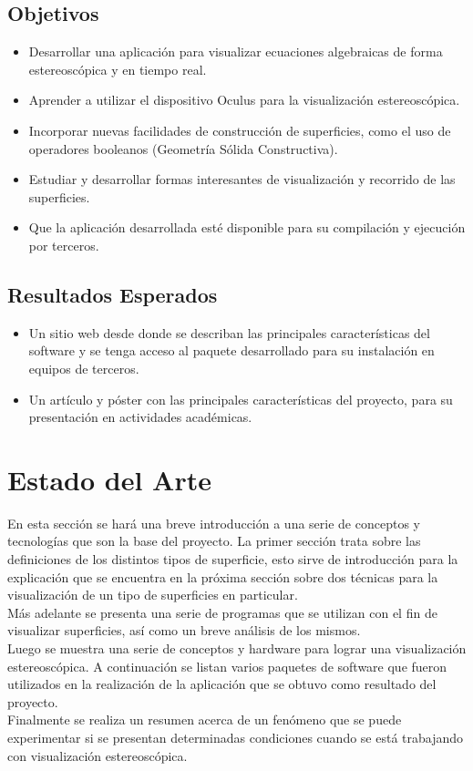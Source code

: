 \documentclass[12pt]{article}
\begin{document}
\subsection{Objetivos}
\begin{itemize}
\item Desarrollar una aplicación para visualizar ecuaciones algebraicas de forma estereoscópica y en tiempo real.
\item Aprender a utilizar el dispositivo Oculus para la visualización estereoscópica. 
\item Incorporar nuevas facilidades de construcción de superficies, como el uso de operadores booleanos (Geometría Sólida Constructiva). 
\item Estudiar y desarrollar formas interesantes de visualización y recorrido de las superficies.
\item Que la aplicación desarrollada esté disponible para su compilación y ejecución por terceros. 
\end{itemize}
\subsection{Resultados Esperados}
\begin{itemize}
\item Un sitio web desde donde se describan las principales características del software y se tenga acceso al paquete desarrollado para su instalación en equipos de terceros. 
\item Un artículo y póster con las principales características del proyecto, para su presentación en actividades académicas.
\end{itemize}
\clearpage
\section{Estado del Arte}
En esta sección se hará una breve introducción a una serie de conceptos y tecnologías que son la base del proyecto. La primer sección trata sobre las definiciones de los distintos tipos de superficie, esto sirve de introducción para la explicación que se encuentra en la próxima sección sobre dos técnicas para la visualización de un tipo de superficies en particular. 
\\Más adelante se presenta una serie de programas que se utilizan con el fin de visualizar superficies, así como un breve análisis de los mismos.
\\Luego se muestra una serie de conceptos y hardware para lograr una visualización estereoscópica. A continuación se listan varios paquetes de software que fueron utilizados en la realización de la aplicación que se obtuvo como resultado del proyecto.
\\Finalmente se realiza un resumen acerca de un fenómeno que se puede experimentar si se presentan determinadas condiciones cuando se está trabajando con visualización estereoscópica.
\end{document}
